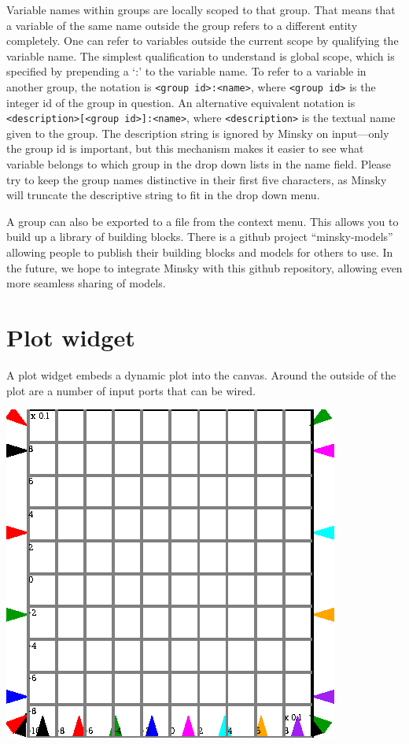 Variable names within groups are locally scoped to that group. That
means that a variable of the same name outside the group refers to a
different entity completely. One can refer to variables outside the
current scope by qualifying the variable name. The simplest
qualification to understand is global scope, which is specified by
prepending a `:' to the variable name. To refer to a variable in
another group, the notation is \verb+<group id>:<name>+, where
\verb+<group id>+ is the integer id of the group in question. An
alternative equivalent notation is \verb+<description>[<group id>]:<name>+, where \verb+<description>+ is the textual name given to
the group. The description string is ignored by Minsky on input---only
the group id is important, but this mechanism makes it easier to see
what variable belongs to which group in the drop down lists in the
name field. Please try to keep the group names distinctive in their
first five characters, as Minsky will truncate the descriptive string
to fit in the drop down menu. 

A group can also be exported to a file from the context menu.
This allows you to build up a library of building blocks. There is a
github project ``minsky-models'' allowing people to publish their
building blocks and models for others to use. In the future, we hope
to integrate Minsky with this github repository, allowing even more
seamless sharing of models.

\section{Plot widget}
\label{PlotWidget}

A plot widget embeds a dynamic plot into the canvas. Around the
outside of the plot are a number of input ports that can be wired.

\begin{center}
\includegraphics{images/plotWidget.eps}
\end{center}

